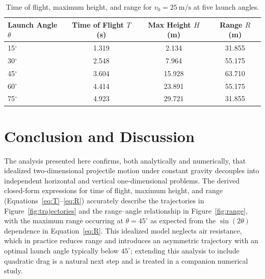 \documentclass[11pt]{article}
\begin{document}
\begin{table}[htbp]
  \centering
  \caption{Time of flight, maximum height, and range for $v_0 = 25~\mathrm{m/s}$ at five launch angles.}
  \label{tab:summary}
  \begin{tabular}{@{}lccc@{}}
    \toprule
    Launch Angle $\theta$ & Time of Flight $T$ (s) & Max Height $H$ (m) & Range $R$ (m) \\
    \midrule
15$^\circ$ & 1.319 & 2.134 & 31.855 \\
30$^\circ$ & 2.548 & 7.964 & 55.175 \\
45$^\circ$ & 3.604 & 15.928 & 63.710 \\
60$^\circ$ & 4.414 & 23.891 & 55.175 \\
75$^\circ$ & 4.923 & 29.721 & 31.855 \\
    \bottomrule
  \end{tabular}
\end{table}

\section{Conclusion and Discussion}
\label{sec:conclusion}

The analysis presented here confirms, both analytically and numerically, that idealized two-dimensional
projectile motion under constant gravity decouples into independent horizontal and vertical
one-dimensional problems. The derived closed-form expressions for time of flight, maximum height, and
range (Equations~\eqref{eq:T}--\eqref{eq:R}) accurately describe the trajectories in
Figure~\ref{fig:trajectories} and the range--angle relationship in Figure~\ref{fig:range}, with the maximum
range occurring at $\theta = 45^\circ$ as expected from the $\sin(2\theta)$ dependence in
Equation~\eqref{eq:R}. This idealized model neglects air resistance, which in practice reduces range and
introduces an asymmetric trajectory with an optimal launch angle typically below $45^\circ$; extending this
analysis to include quadratic drag is a natural next step and is treated in a companion numerical study.
\end{document}
